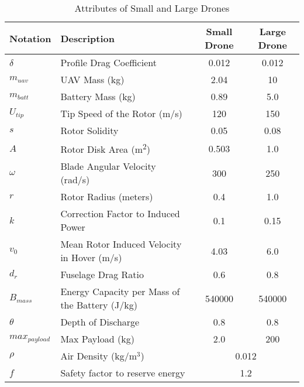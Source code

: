 \documentclass[preprint,review,11pt,authoryear]{elsarticle}
\begin{document}
\begin{table}[h!]
    \centering
    \caption{Attributes of Small and Large Drones}
    \begin{tabular}{|l|l|c|c|}
    \hline
    \textbf{Notation} & \textbf{Description} & \textbf{Small Drone} & \textbf{Large Drone} \\ \hline
    \texttt{$\delta$}    & Profile Drag Coefficient                & 0.012                 & 0.012               \\ \hline
    \texttt{$m_{uav}$}   & UAV Mass (kg)                           & 2.04                  & 10                  \\ \hline
    \texttt{$m_{batt}$}  & Battery Mass (kg)                       & 0.89                  & 5.0                 \\ \hline
    \texttt{$U_{tip}$}   & Tip Speed of the Rotor (m/s)            & 120                   & 150                 \\ \hline
    \texttt{$s$}        & Rotor Solidity                           & 0.05                  & 0.08                \\ \hline
    \texttt{$A$}        & Rotor Disk Area (m\textsuperscript{2})   & 0.503                 & 1.0                 \\ \hline
    \texttt{$\omega$}    & Blade Angular Velocity (rad/s)          & 300                   & 250                 \\ \hline
    \texttt{$r$}        & Rotor Radius (meters)                    & 0.4                   & 1.0                 \\ \hline
    \texttt{$k$}        & Correction Factor to Induced Power       & 0.1                   & 0.15                \\ \hline
    \texttt{$v_0$}     & Mean Rotor Induced Velocity in Hover (m/s) & 4.03                & 6.0                 \\ \hline
    \texttt{$d_r$}     & Fuselage Drag Ratio                       & 0.6                   & 0.8                 \\ \hline
    \texttt{$B_{mass}$}  & Energy Capacity per Mass of the Battery (J/kg) & 540000           & 540000              \\ \hline
    \texttt{$\theta$}    & Depth of Discharge                      & 0.8                   & 0.8                 \\ \hline
    \texttt{$max_{payload}$} & Max Payload (kg)                    & 2.0                   & 200                 \\ \hline
    \texttt{$\rho$}    & Air Density (kg/$\text{m}^3$)                 & \multicolumn{2}{|c|}{0.012}              \\ \hline
    \texttt{$f$}    & Safety factor to reserve energy                 & \multicolumn{2}{|c|}{1.2}              \\ \hline  
    \end{tabular}
    \label{tab:drone_attributes}
\end{table}
\end{document}
